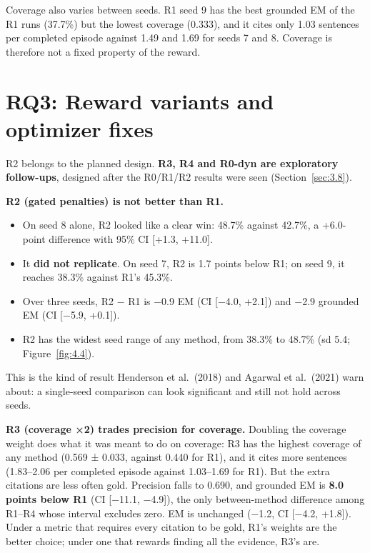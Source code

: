 Coverage also varies between seeds. R1 seed 9 has the best grounded EM
of the R1 runs (37.7\%) but the lowest coverage (0.333), and it cites
only 1.03 sentences per completed episode against 1.49 and 1.69 for
seeds 7 and 8. Coverage is therefore not a fixed property of the reward.

\section{RQ3: Reward variants and optimizer fixes}\label{sec:4.6}

R2 belongs to the planned design. \textbf{R3, R4 and R0-dyn are
exploratory follow-ups}, designed after the R0/R1/R2 results were seen
(Section~\ref{sec:3.8}).

\textbf{R2 (gated penalties) is not better than R1.}

\begin{itemize}
\tightlist
\item
  On seed 8 alone, R2 looked like a clear win: 48.7\% against 42.7\%, a
  +6.0-point difference with 95\% CI {[}+1.3, +11.0{]}.
\item
  It \textbf{did not replicate}. On seed 7, R2 is 1.7 points below R1;
  on seed 9, it reaches 38.3\% against R1's 45.3\%.
\item
  Over three seeds, R2 − R1 is −0.9 EM (CI {[}−4.0, +2.1{]}) and −2.9
  grounded EM (CI {[}−5.9, +0.1{]}).
\item
  R2 has the widest seed range of any method, from 38.3\% to 48.7\% (sd
  5.4; Figure~\ref{fig:4.4}).
\end{itemize}

This is the kind of result Henderson et al.~(2018) and Agarwal et
al.~(2021) warn about: a single-seed comparison can look significant and
still not hold across seeds.

\textbf{R3 (coverage ×2) trades precision for coverage.} Doubling the
coverage weight does what it was meant to do on coverage: R3 has the
highest coverage of any method (0.569 ± 0.033, against 0.440 for R1),
and it cites more sentences (1.83--2.06 per completed episode against
1.03--1.69 for R1). But the extra citations are less often gold.
Precision falls to 0.690, and grounded EM is \textbf{8.0 points below
R1} (CI {[}−11.1, −4.9{]}), the only between-method difference among
R1--R4 whose interval excludes zero. EM is unchanged (−1.2, CI {[}−4.2,
+1.8{]}). Under a metric that requires every citation to be gold, R1's
weights are the better choice; under one that rewards finding all the
evidence, R3's are.

